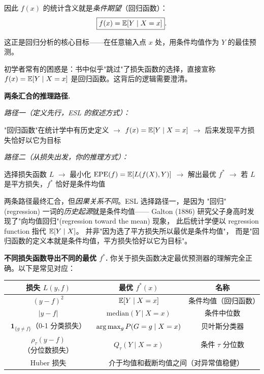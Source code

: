 因此 $f(x)$ 的统计含义就是\emph{条件期望}（回归函数）：
\begin{equation}
    \boxed{f(x) = \mathbb{E}[Y \mid X = x]}.
\end{equation}

这正是回归分析的核心目标——在任意输入点 $x$ 处，用条件均值作为 $Y$ 的最佳预测。

\begin{remark}
初学者常有的困惑是：书中似乎"跳过"了损失函数的选择，直接宣称
$f(x) = \mathbb{E}[Y \mid X = x]$ 是回归函数。这背后的逻辑需要澄清。

\textbf{两条汇合的推理路径.}

\emph{路径一（定义先行，ESL 的叙述方式）：}
\begin{center}
"回归函数"在统计学中有历史定义 $\longrightarrow$ $f(x) = \mathbb{E}[Y \mid X = x]$
$\longrightarrow$ 后来发现平方损失恰好以它为目标
\end{center}

\emph{路径二（从损失出发，你的推理方式）：}
\begin{center}
选择损失函数 $L$ $\longrightarrow$ 最小化 $\mathrm{EPE}(f) = \mathbb{E}[L(f(X), Y)]$
$\longrightarrow$ 解出最优 $f^*$ $\longrightarrow$ 若 $L$ 是平方损失，$f^*$ 恰好是条件均值
\end{center}

两条路径最终汇合，但\emph{因果关系不同}。ESL 选择路径一，是因为
"回归"(regression) 一词的\emph{历史起源}就是条件均值——
Galton (1886) 研究父子身高时发现了"向均值回归"(regression toward the mean) 现象，
此后统计学便以 regression function 指代 $\mathbb{E}[Y \mid X]$。
并非"因为选了平方损失所以最优是条件均值"，
而是"回归函数的定义本就是条件均值，平方损失恰好以它为目标"。

\textbf{不同损失函数导出不同的最优 $f^*$.}
你关于损失函数决定最优预测器的理解完全正确。以下是常见对应：

\begin{center}
\renewcommand{\arraystretch}{1.4}
\begin{tabular}{c|c|c}
\toprule
\textbf{损失 $L(y, f)$} & \textbf{最优 $f^*(x)$} & \textbf{名称} \\
\midrule
$(y - f)^2$ & $\mathbb{E}[Y \mid X = x]$ & 条件均值（回归函数） \\
$|y - f|$ & $\mathrm{median}(Y \mid X = x)$ & 条件中位数 \\
$\mathbf{1}_{\{g \neq f\}}$（0-1 分类损失） & $\arg\max_g P(G = g \mid X = x)$ & 贝叶斯分类器 \\
$\rho_\tau(y - f)$（分位数损失） & $Q_\tau(Y \mid X = x)$ & 条件 $\tau$ 分位数 \\
Huber 损失 & \multicolumn{2}{c}{介于均值和截断均值之间（对异常值稳健）} \\
\bottomrule
\end{tabular}
\end{center}


\end{remark}
